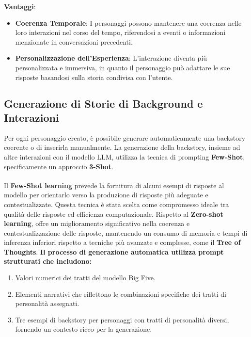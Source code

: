 \textbf{Vantaggi}:
\begin{itemize}
    \item
    \textbf{Coerenza Temporale}:
    I personaggi possono mantenere una coerenza nelle loro interazioni nel corso del tempo, riferendosi a eventi o informazioni menzionate in conversazioni precedenti.
    \item
    \textbf{Personalizzazione dell'Esperienza}:
    L'interazione diventa più personalizzata e immersiva, in quanto il personaggio può adattare le sue risposte basandosi sulla storia condivisa con l'utente.
\end{itemize}

\clearpage

\subsection{Generazione di Storie di Background e Interazioni}

Per ogni personaggio creato, è possibile generare automaticamente una backstory coerente o di inserirla manualmente.
La generazione della backstory, insieme ad altre interazioni con il modello LLM, utilizza la tecnica di prompting \textbf{Few-Shot}\cite{brown2020language}, specificamente un approccio \textbf{3-Shot}.\\\\
Il \textbf{Few-Shot learning} prevede la fornitura di alcuni esempi di risposte al modello per orientarlo verso la produzione di risposte più adeguate e contestualizzate.
Questa tecnica è stata scelta come compromesso ideale tra qualità delle risposte ed efficienza computazionale. Rispetto al \textbf{Zero-shot learning}, offre un miglioramento significativo nella coerenza e contestualizzazione delle risposte, mantenendo un consumo di memoria e tempi di inferenza inferiori rispetto a tecniche più avanzate e complesse, come il \textbf{Tree of Thoughts}\cite{yao2023treethoughtsdeliberateproblem}.
\textbf{Il processo di generazione automatica utilizza prompt strutturati che includono:}

\begin{enumerate} \item Valori numerici dei tratti del modello Big Five. \item Elementi narrativi che riflettono le combinazioni specifiche dei tratti di personalità assegnati. \item Tre esempi di backstory per personaggi con tratti di personalità diversi, fornendo un contesto ricco per la generazione. \end{enumerate}

